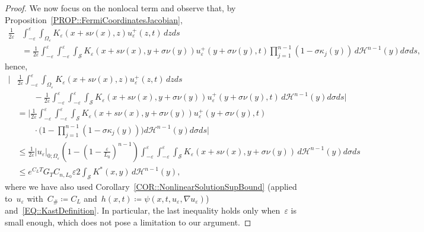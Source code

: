 \documentclass[12pt,a4paper]{amsart}
\numberwithin{equation}{section}
\theoremstyle{definition}
\theoremstyle{remark}
\newcommand{\eps}{\varepsilon}
\newcommand{\abs}[1]{\left\lvert#1\right\rvert}
\renewcommand{\leq}{\leqslant}
\begin{document}
\begin{proof}
    We now focus on the nonlocal term and observe that, by Proposition~\ref{PROP::FermiCoordinatesJacobian},
    \begin{align}
        \frac{1}{2\eps}&\int_{-\eps}^\eps \int_{\Omega_\eps} K_\eps(x+s\nu(x),z)u_\eps^+(z,t)\,dzds\\
            &= \frac{1}{2\eps}\int_{-\eps}^\eps \int_{-\eps}^\eps\int_{\mathcal{S}} K_\eps(x+s\nu(x),y+\sigma\nu(y)) u_\eps^+(y+\sigma\nu(y),t)\prod_{j=1}^{n-1}(1-\sigma\kappa_j(y))\,d\mathcal{H}^{n-1}(y)d\sigma ds,
    \end{align}
    hence,
    \begin{equation}\label{EQ::KepsEstimateCurvature}
        \begin{split}
            \bigg|&\frac{1}{2\eps}\int_{-\eps}^\eps \int_{\Omega_\eps} K_\eps(x+s\nu(x),z)u_\eps^+(z,t)\,dzds\\
                &\qquad - \frac{1}{2\eps}\int_{-\eps}^\eps \int_{-\eps}^\eps\int_{\mathcal{S}} K_\eps(x+s\nu(x),y+\sigma\nu(y)) u_\eps^+(y+\sigma\nu(y),t)\,d\mathcal{H}^{n-1}(y)d\sigma ds\bigg|\\
                &= \bigg|\frac{1}{2\eps}\int_{-\eps}^\eps \int_{-\eps}^\eps\int_{\mathcal{S}} K_\eps(x+s\nu(x),y+\sigma\nu(y))u_\eps^+(y+\sigma\nu(y),t)\\
                &\qquad \cdot \bigg(1-\prod_{j=1}^{n-1}(1-\sigma\kappa_j(y))\bigg)d\mathcal{H}^{n-1}(y)d\sigma ds\bigg|\\ 
                &\leq \frac{1}{2\eps}\abs{u_\eps}_{0; \Omega_\eps} \left(1-{\left(1-\frac{\eps}{L_0}\right)}^{n-1}\right) \int_{-\eps}^\eps \int_{-\eps}^\eps\int_{\mathcal{S}} K_\eps(x+s\nu(x),y+\sigma\nu(y))\,d\mathcal{H}^{n-1}(y)d\sigma ds\\
                &\leq e^{C_L T}G_T C_{n,L_0}\eps 2\int_{\mathcal{S}}K^\ast(x,y)\,d\mathcal{H}^{n-1}(y),
        \end{split}
    \end{equation}
    where we have also used Corollary~\ref{COR::NonlinearSolutionSupBound} (applied to~$u_\eps$ with~$C_\# \coloneq C_L$ and~$h(x,t) \coloneq \psi(x,t,u_\eps,\nabla u_\eps)$) and~\eqref{EQ::KastDefinition}. In particular, the last inequality holds only when~$\eps$ is small enough, which does not pose a limitation to our argument.
    

\end{proof}
\end{document}
